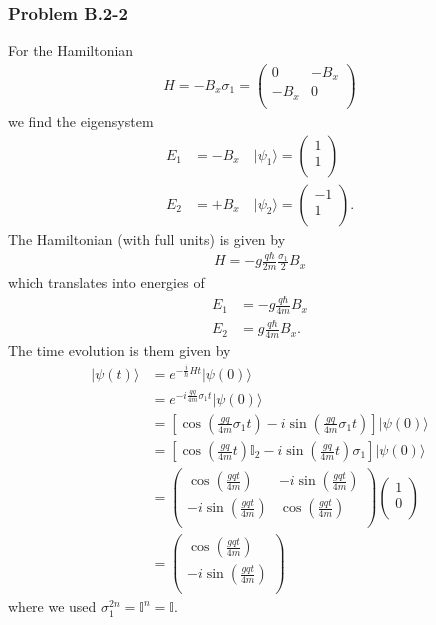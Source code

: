 \documentclass[10pt,a4paper]{book}
\theoremstyle{definition}
\begin{document}
\subsubsection{Problem B.2-2}
For the Hamiltonian
\begin{align}
H = -B_x\sigma_1=\left(
\begin{array}{cc}
 0 & -B_x  \\
 -B_x & 0  \\
\end{array}
\right)
\end{align}
we find the eigensystem
\begin{align}
E_1 &= -B_x\quad |\psi_1\rangle=\left(
\begin{array}{c}
 1 \\
 1 \\
\end{array}
\right)\\
E_2 &= +B_x\quad |\psi_2\rangle=\left(
\begin{array}{c}
-1 \\
 1 \\
\end{array}
\right).
\end{align}
The Hamiltonian (with full units) is given by
\begin{align}
H = -g\frac{q\hbar}{2m}\frac{\sigma_1}{2}B_x
\end{align}
which translates into energies of
\begin{align}
E_1 &= -g\frac{q\hbar}{4m}B_x\\
E_2 &= g\frac{q\hbar}{4m}B_x.
\end{align}
The time evolution is them given by
\begin{align}
|\psi(t)\rangle&=e^{-\frac{i}{\hbar}Ht}|\psi(0)\rangle\\
&=e^{-i\frac{gq}{4m}\sigma_1t}|\psi(0)\rangle\\
&=\left[\cos\left(\frac{gq}{4m}\sigma_1t\right)-i\sin\left(\frac{gq}{4m}\sigma_1t\right)\right]|\psi(0)\rangle\\
&=\left[\cos\left(\frac{gq}{4m}t\right)\mathbb{I}_2-i\sin\left(\frac{gq}{4m}t\right)\sigma_1\right]|\psi(0)\rangle\\
&=\left(
\begin{array}{cc}
 \cos \left(\frac{g q t}{4 m}\right) & -i \sin \left(\frac{g q t}{4 m}\right) \\
 -i \sin \left(\frac{g q t}{4 m}\right) & \cos \left(\frac{g q t}{4 m}\right) \\
\end{array}
\right)
\left(
\begin{array}{c}
 1 \\
 0 \\
\end{array}
\right)\\
&=\left(
\begin{array}{c}
 \cos \left(\frac{g q t}{4 m}\right) \\
 -i\sin \left(\frac{g q t}{4 m}\right) \\
\end{array}
\right)
\end{align}
where we used $\sigma_1^{2n}=\mathbb{I}^n=\mathbb{I}$.
\end{document}
